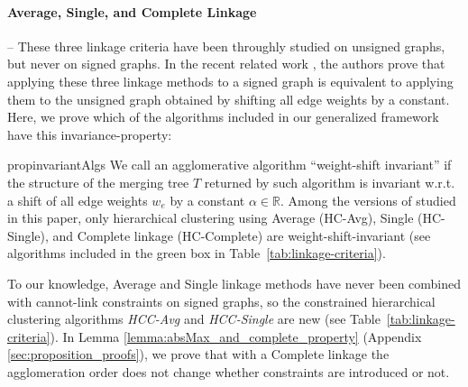 \paragraph{Average, Single, and Complete Linkage} -- These three linkage criteria have been throughly studied on unsigned graphs, but never on signed graphs. In the recent related work \cite{chehreghani2020hierarchical}, the authors prove that applying these three linkage methods to a signed graph is equivalent to applying them to the unsigned graph obtained by shifting all edge weights by a constant.  Here, we prove which of the algorithms included in our generalized framework have this invariance-property:
\begin{restatable}{prop}{invariantAlgs}
\label{prop:weight_shift_invariant}
We call an agglomerative algorithm ``weight-shift invariant'' if the structure of the merging tree $T$ returned by such algorithm is invariant w.r.t. a shift of all edge weights $w_e$  by a constant $\alpha\in \mathbb{R}$. Among the versions of \algname{} studied in this paper, only hierarchical clustering using Average (HC-Avg), Single (HC-Single), and Complete linkage (HC-Complete) are weight-shift-invariant (see algorithms included in the green box in Table~\ref{tab:linkage-criteria}).
\end{restatable}
\noindent To our knowledge, Average and Single linkage methods have never been combined with cannot-link constraints on signed graphs, so the constrained hierarchical clustering algorithms \emph{HCC-Avg} and \emph{HCC-Single} are new (see Table~\ref{tab:linkage-criteria}). In Lemma \ref{lemma:absMax_and_complete_property} (Appendix \ref{sec:proposition_proofs}), we prove that with a Complete linkage the agglomeration order does not change whether constraints are introduced or not.










